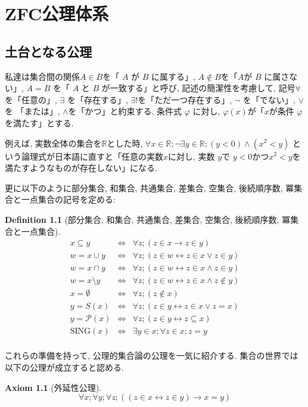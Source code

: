 \documentclass[lualatex]{ltjsbook}
\newtheorem{definition}[theorem]{Definition}
\theoremstyle{remark}
\theoremstyle{plain}
\newtheorem{axiom}{Axiom}
\begin{document}
\chapter{ZFC公理体系}%
\label{cha:ZFC公理体系}

\section{土台となる公理}

私達は集合間の関係$A \in B$を「 $A$ が $B$ に属する」, $A \not\in  B$を「$A$が $B$ に属さない」, $A = B$ を「 $A$ と $B$ が一致する」と呼び, 
記述の簡潔性を考慮して,
記号$\forall $ を「任意の」, $\exists $ を「存在する」, $\exists !$を「ただ一つ存在する」,  $\lnot$ を「でない」, $\lor$を 「または」,  $\land$を「かつ」と約束する.
条件式 $\varphi$ に対し, $\varphi(x)$が「$x$が条件 $\varphi$を満たす」とする.

例えば, 実数全体の集合を$\mathbb{R}$とした時, $\forall x \in \mathbb{R}; \lnot \exists y \in \mathbb{R}; (y <0 ) \land (x^2 <y )$ という論理式が日本語に直すと「任意の実数$x$に対し, 実数 $y$で $y <0 $かつ$x^2<y$を満たすようなものが存在しない」になる.

更に以下のように部分集合, 和集合, 共通集合, 差集合, 空集合, 後続順序数, 冪集合と一点集合の記号を定める:
\begin{definition}[部分集合, 和集合, 共通集合, 差集合, 空集合, 後続順序数, 冪集合と一点集合]
\[
	\begin{array}{rcl}
		x \subseteq y &\iff & \forall z;\left( z \in x \rightarrow z \in y \right) \\
		w = x\cup y & \iff & \forall z;\left( z \in w \leftrightarrow z \in x \lor z \in y \right) \\
		w = x \cap y & \iff & \forall z;\left( z \in w \leftrightarrow z \in x \land z \in y \right) \\
		w = x\setminus y &\iff & \forall z;\left( z \in w \leftrightarrow z \in x \land z \not\in y \right)\\ 
		x = \emptyset & \iff &\forall z;\left( z \not\in x \right) \\
		y = S(x) & \iff & \forall z;(z \in y \leftrightarrow z \in x \lor z = x) \\
		y = \mathcal{P}(x)& \iff & \forall z; \left( z \in y \leftrightarrow z \subseteq x \right) \\
		\mathrm{SING}(x) &\iff & \exists y \in x; \forall z \in x ; z=y\\

\end{array}
\] 	
\end{definition}
これらの準備を持って, 公理的集合論の公理を一気に紹介する.
集合の世界では以下の公理が成立すると認める.
\begin{axiom}[外延性公理] 
	$$\forall x; \forall y; \forall z;  \left( \left( z \in x \leftrightarrow z \in y \right)  \rightarrow x = y \right) $$
\end{axiom}
\end{document}
